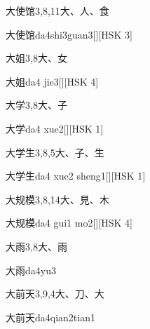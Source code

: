 \begin{entry}{大使馆}{3,8,11}{⼤、⼈、⾷}
  \begin{phonetics}{大使馆}{da4shi3guan3}[][HSK 3]
  \end{phonetics}
\end{entry}

\begin{entry}{大姐}{3,8}{⼤、⼥}
  \begin{phonetics}{大姐}{da4 jie3}[][HSK 4]
  \end{phonetics}
\end{entry}

\begin{entry}{大学}{3,8}{⼤、⼦}
  \begin{phonetics}{大学}{da4 xue2}[][HSK 1]
  \end{phonetics}
\end{entry}

\begin{entry}{大学生}{3,8,5}{⼤、⼦、⽣}
  \begin{phonetics}{大学生}{da4 xue2 sheng1}[][HSK 1]
  \end{phonetics}
\end{entry}

\begin{entry}{大规模}{3,8,14}{⼤、⾒、⽊}
  \begin{phonetics}{大规模}{da4 gui1 mo2}[][HSK 4]
  \end{phonetics}
\end{entry}

\begin{entry}{大雨}{3,8}{⼤、⾬}
  \begin{phonetics}{大雨}{da4yu3}
  \end{phonetics}
\end{entry}

\begin{entry}{大前天}{3,9,4}{⼤、⼑、⼤}
  \begin{phonetics}{大前天}{da4qian2tian1}
  \end{phonetics}
\end{entry}

